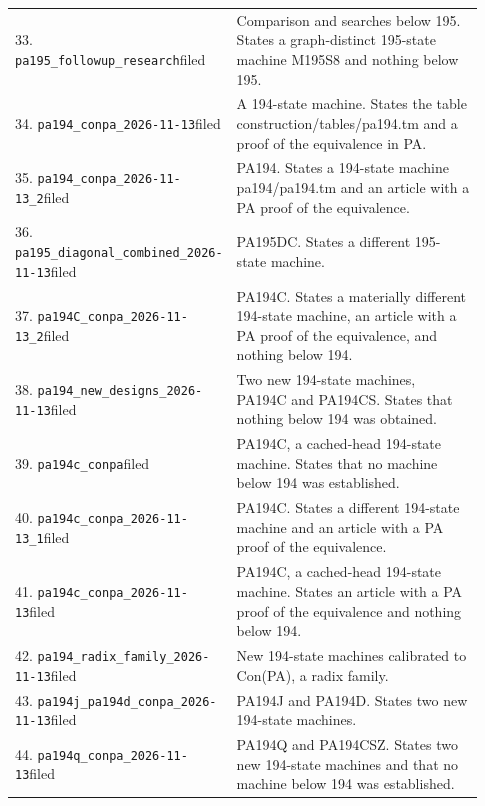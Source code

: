 {\begin{longtable}{@{}p{0.34\linewidth}p{0.59\linewidth}@{}}
33. \nolinkurl{pa195_followup_research}\newline filed&Comparison and searches below 195. States a graph-distinct 195-state machine M195S8 and nothing below 195.\\[4pt]
34. \nolinkurl{pa194_conpa_2026-11-13}\newline filed&A 194-state machine. States the table construction/tables/pa194.tm and a proof of the equivalence in PA.\\[4pt]
35. \nolinkurl{pa194_conpa_2026-11-13_2}\newline filed&PA194. States a 194-state machine pa194/pa194.tm and an article with a PA proof of the equivalence.\\[4pt]
36. \nolinkurl{pa195_diagonal_combined_2026-11-13}\newline filed&PA195DC. States a different 195-state machine.\\[4pt]
37. \nolinkurl{pa194C_conpa_2026-11-13_2}\newline filed&PA194C. States a materially different 194-state machine, an article with a PA proof of the equivalence, and nothing below 194.\\[4pt]
38. \nolinkurl{pa194_new_designs_2026-11-13}\newline filed&Two new 194-state machines, PA194C and PA194CS. States that nothing below 194 was obtained.\\[4pt]
39. \nolinkurl{pa194c_conpa}\newline filed&PA194C, a cached-head 194-state machine. States that no machine below 194 was established.\\[4pt]
40. \nolinkurl{pa194c_conpa_2026-11-13_1}\newline filed&PA194C. States a different 194-state machine and an article with a PA proof of the equivalence.\\[4pt]
41. \nolinkurl{pa194c_conpa_2026-11-13}\newline filed&PA194C, a cached-head 194-state machine. States an article with a PA proof of the equivalence and nothing below 194.\\[4pt]
42. \nolinkurl{pa194_radix_family_2026-11-13}\newline filed&New 194-state machines calibrated to Con(PA), a radix family.\\[4pt]
43. \nolinkurl{pa194j_pa194d_conpa_2026-11-13}\newline filed&PA194J and PA194D. States two new 194-state machines.\\[4pt]
44. \nolinkurl{pa194q_conpa_2026-11-13}\newline filed&PA194Q and PA194CSZ. States two new 194-state machines and that no machine below 194 was established.\\[4pt]

\end{longtable}}
